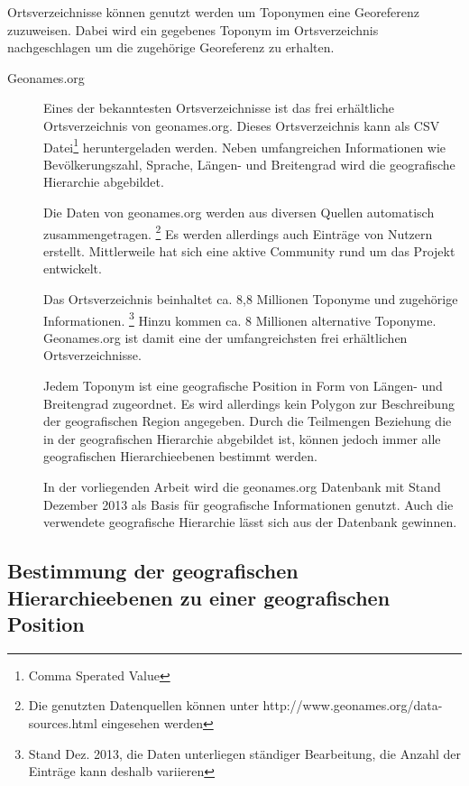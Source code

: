 			Ortsverzeichnisse können genutzt werden um Toponymen eine Georeferenz zuzuweisen. 
			Dabei wird ein gegebenes Toponym im Ortsverzeichnis nachgeschlagen um die zugehörige Georeferenz zu erhalten.  

			\begin{description}

				\item[Geonames.org]
					
					Eines der bekanntesten Ortsverzeichnisse ist das frei erhältliche Ortsverzeichnis von geonames.org. 
					Dieses Ortsverzeichnis kann als CSV Datei\footnote{Comma Sperated Value} heruntergeladen werden.
					Neben umfangreichen Informationen wie Bevölkerungszahl, Sprache, Längen- und Breitengrad wird die geografische Hierarchie abgebildet.

					Die Daten von geonames.org werden aus diversen Quellen automatisch zusammengetragen. \footnote{Die genutzten Datenquellen können unter http://www.geonames.org/data-sources.html eingesehen werden} 
					Es werden allerdings auch Einträge von Nutzern erstellt. 
					Mittlerweile hat sich eine aktive Community rund um das Projekt entwickelt. 

					Das Ortsverzeichnis beinhaltet ca. 8,8 Millionen Toponyme und zugehörige Informationen. \footnote{Stand Dez. 2013, die Daten unterliegen ständiger Bearbeitung, die Anzahl der Einträge kann deshalb variieren} 
					Hinzu kommen ca. 8 Millionen alternative Toponyme.
					Geonames.org ist damit eine der umfangreichsten frei erhältlichen Ortsverzeichnisse.

					Jedem Toponym ist eine geografische Position in Form von Längen- und Breitengrad zugeordnet. 
					Es wird allerdings kein Polygon zur Beschreibung der geografischen Region angegeben.
					Durch die Teilmengen Beziehung die in der geografischen Hierarchie abgebildet ist, können jedoch immer alle geografischen Hierarchieebenen bestimmt werden.

					In der vorliegenden Arbeit wird die geonames.org Datenbank mit Stand Dezember 2013 als Basis für geografische Informationen genutzt.
					Auch die verwendete geografische Hierarchie lässt sich aus der Datenbank gewinnen.

			\end{description}
			
		\subsection{Bestimmung der geografischen Hierarchieebenen zu einer geografischen Position} 
			
